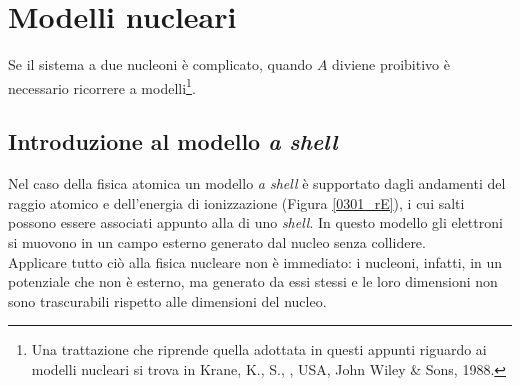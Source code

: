 \chapter{Modelli nucleari}
Se il sistema a due nucleoni è complicato, quando $A$ diviene proibitivo è necessario ricorrere a modelli\footnote{Una trattazione che riprende quella adottata in questi appunti riguardo ai modelli nucleari si trova in Krane, K., S., \textit{}, USA, John Wiley \& Sons, 1988.}.
\section{Introduzione al modello \textit{a shell}}
Nel caso della fisica atomica un modello \textit{a shell} è supportato dagli andamenti del raggio atomico e dell'energia di ionizzazione (Figura \ref{0301_rE}), i cui salti possono essere associati  appunto alla  di uno \textit{shell}. In questo modello gli elettroni si muovono in un campo esterno generato dal nucleo senza collidere.\\
Applicare tutto ciò alla fisica nucleare non è immediato: i nucleoni, infatti,  in un potenziale che non è esterno, ma generato da essi stessi e le loro dimensioni non sono trascurabili rispetto alle dimensioni del nucleo.
